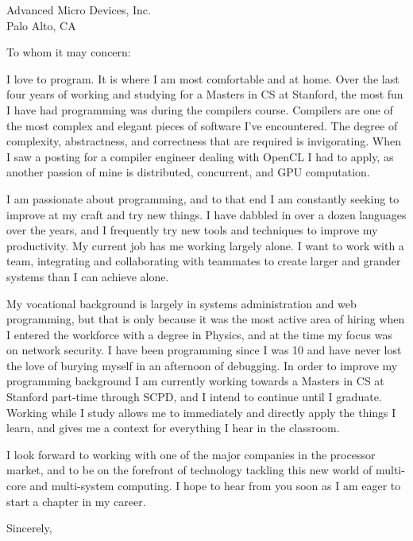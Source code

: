 \documentclass{letter}[11pt]
\begin{document}
\begin{letter}{Advanced Micro Devices, Inc.\\
Palo Alto, CA
}

\opening{To whom it may concern:}

I love to program.  It is where I am most comfortable and at home.  Over the last four years of working and studying for a Masters in CS at Stanford, the most fun I have had programming was during the compilers course.  Compilers are one of the most complex and elegant pieces of software I've encountered.  The degree of complexity, abstractness, and correctness that are required is invigorating.  When I saw a posting for a compiler engineer dealing with OpenCL I had to apply, as another passion of mine is distributed, concurrent, and GPU computation.

I am passionate about programming, and to that end I am constantly seeking to improve at my craft and try new things.  I have dabbled in over a dozen languages over the years, and I frequently try new tools and techniques to improve my productivity.  My current job has me working largely alone.  I want to work with a team, integrating and collaborating with teammates to create larger and grander systems than I can achieve alone.

My vocational background is largely in systems administration and web programming, but that is only because it was the most active area of hiring when I entered the workforce with a degree in Physics, and at the time my focus was on network security.  I have been programming since I was 10 and have never lost the love of burying myself in an afternoon of debugging.  In order to improve my programming background I am currently working towards a Masters in CS at Stanford part-time through SCPD, and I intend to continue until I graduate.  Working while I study allows me to immediately and directly apply the things I learn, and gives me a context for everything I hear in the classroom.

I look forward to working with one of the major companies in the processor market, and to be on the forefront of technology tackling this new world of multi-core and multi-system computing.  I hope to hear from you soon as I am eager to start a chapter in my career.

\closing{Sincerely,}
\end{letter}
\end{document}
